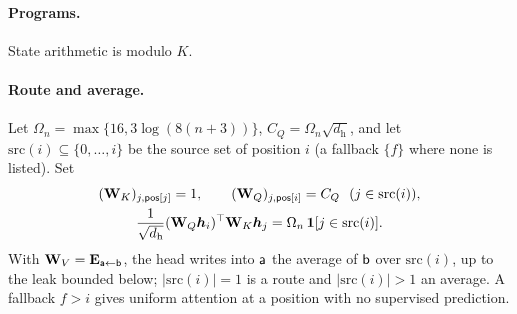 \paragraph{Programs.} State arithmetic is modulo $K$.
\begin{center}\small
{}
\end{center}

\paragraph{Route and average.} Let $\Omega_n=\max\{16,3\log(8(n+3))\}$, $C_Q=\Omega_n\sqrt{d_{\mathrm h}}$, and let $\mathrm{src}(i)\subseteq\{0,\ldots,i\}$ be the source set
of position $i$ (a fallback $\{f\}$ where none is listed). Set
\begin{equation}
 \begin{gathered}
 (\mathbf W_K)_{j,\reg{pos}[j]}=1,\qquad (\mathbf W_Q)_{j,\reg{pos}[i]}=C_Q\ \ (j\in\mathrm{src}(i)),\\
 \tfrac{1}{\sqrt{d_{\mathrm h}}}(\mathbf W_Q\bm h_i)^\top \mathbf W_K\bm h_j=\Omega_n\,\one[j\in\mathrm{src}(i)] .
 \end{gathered}
 \label{eq:route}
\end{equation}
With $\mathbf W_V=\mathbf E_{\mathsf{a}\leftarrow\mathsf{b}}$, the head writes into $\mathsf{a}$ the average of $\mathsf{b}$ over $\mathrm{src}(i)$, up to the leak bounded below; $|\mathrm{src}(i)|=1$ is a
route and $|\mathrm{src}(i)|>1$ an average. A fallback $f>i$ gives uniform attention at a position with no supervised prediction.

